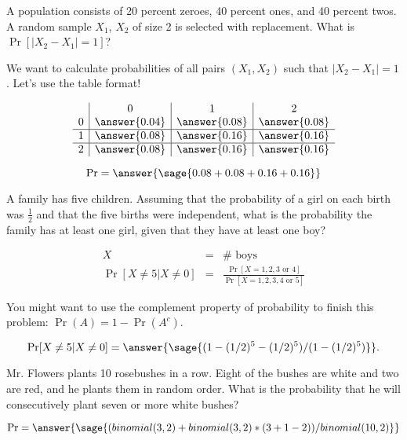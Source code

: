 \documentclass{ximera}
\begin{document}
\begin{problem}
A population consists of 20 percent zeroes, 40 percent ones, and 40 percent twos. A random sample $X_1$, $X_2$ of size 2 is selected with replacement. What is $\Pr[|X_2-X_1|=1]$?
\begin{hint}
We want to calculate probabilities of all pairs $(X_1,X_2)$ such that $|X_2-X_1|=1$. Let's use the table format!
\end{hint}


\begin{prompt}
$$
\begin{array}{c|c|c|c}
  & 0 & 1 & 2 \\
0 &\answer{0.04} & \answer{0.08} & \answer{0.08} \\
\hline
1 &\answer{0.08} & \answer{0.16} & \answer{0.16} \\
\hline
2 &\answer{0.08} & \answer{0.16} & \answer{0.16} \\
\end{array}
$$

$$\Pr=\answer{\sage{0.08+0.08+0.16+0.16}}$$
\end{prompt}

\end{problem}

\begin{problem}
A family has five children. Assuming that the probability of a girl on each birth was $\frac{1}{2}$ and that the five births were independent, what is the probability the family has at least one girl, given that they have at least one boy? 
\begin{hint}
\begin{eqnarray*} X&=& \# \text{ boys } \\ 
\Pr[X \not= 5 | X \not= 0 ] &=&\frac{\Pr[X=1,2,3\text{ or }4]}{\Pr[X=1,2,3,4 \text{ or }5]} \end{eqnarray*} 

You might want to use the complement property of probability to finish this problem: $\Pr(A)=1-\Pr(A^c)$.
\end{hint}

\begin{prompt}
$$\Pr[X \not= 5 | X \not= 0 ]=\answer{\sage{(1-(1/2)^5-(1/2)^5)/(1-(1/2)^5)}}.$$
\end{prompt}

\end{problem}

\begin{problem}
Mr. Flowers plants 10 rosebushes in a row. Eight of the bushes are white and two are red, and he plants them in random order. What is the probability that he will consecutively plant seven or more white bushes? 
\begin{hint}
\end{hint}

\begin{prompt}
$$\Pr=\answer{\sage{(binomial(3,2)+binomial(3,2)*(3+1-2))/binomial(10,2)}}$$
\end{prompt}

\end{problem}
\end{document}
